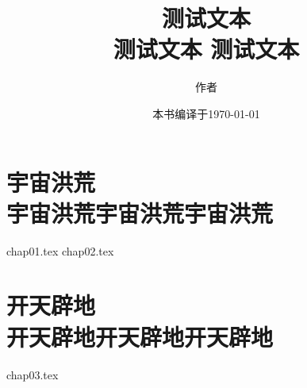 \documentclass[UTF8,a5paper,zihao=-4,titlepage,oneside]{ctexbook}
\begin{document}
\title{
    测试文本 \\
    测试文本 测试文本}
\author{作者}
\date{本书编译于\today}

\maketitle

\tableofcontents

\frontmatter

\mainmatter

\setlength{\parskip}{0.5em}

\part[宇宙洪荒]
     {宇宙洪荒\\[\bigskipamount] 
      {\normalfont \normalsize 宇宙洪荒宇宙洪荒宇宙洪荒}}

{chap01.tex}
{chap02.tex}

\part[开天辟地]
     {开天辟地\\[\bigskipamount] 
      {\normalfont \normalsize 开天辟地开天辟地开天辟地}}

{chap03.tex}

\setlength{\parskip}{0pt}
\end{document}
